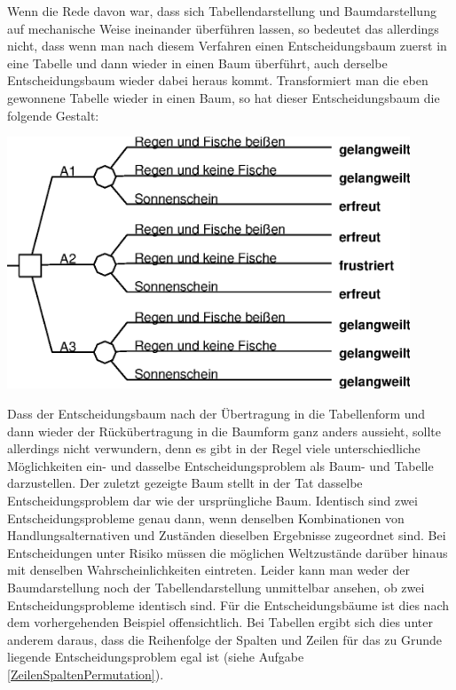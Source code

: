 Wenn die Rede davon war, dass sich Tabellendarstellung und
Baumdarstellung auf mechanische Weise ineinander überführen lassen, so
bedeutet das allerdings nicht, dass wenn man nach diesem Verfahren
einen Entscheidungsbaum zuerst in eine Tabelle und dann wieder in
einen Baum überführt, auch derselbe Entscheidungsbaum wieder dabei
heraus kommt. Transformiert man die eben gewonnene Tabelle wieder in
einen Baum, so hat dieser Entscheidungsbaum die folgende Gestalt:

\begin{center}
\includegraphics[width=12cm]{Grafiken/Beispiel1_4.eps}
\end{center}

Dass der Entscheidungsbaum nach der Übertragung in die Tabellenform und dann
wieder der Rückübertragung in die Baumform ganz anders aussieht, sollte
allerdings nicht verwundern, denn es gibt in der Regel viele unterschiedliche 
Möglichkeiten ein- und dasselbe Entscheidungsproblem als Baum- und Tabelle
darzustellen. Der zuletzt gezeigte Baum stellt in der Tat dasselbe
Entscheidungsproblem dar wie der ursprüngliche Baum. Identisch sind zwei
Entscheidungsprobleme genau dann, wenn denselben Kombinationen von
Handlungsalternativen und Zuständen dieselben Ergebnisse zugeordnet sind. Bei
Entscheidungen unter Risiko müssen die möglichen Weltzustände darüber hinaus
mit denselben Wahrscheinlichkeiten eintreten. Leider kann man weder der
Baumdarstellung noch der Tabellendarstellung unmittelbar ansehen, ob zwei
Entscheidungsprobleme identisch sind. Für die Entscheidungsbäume ist dies nach
dem vorhergehenden Beispiel offensichtlich. Bei Tabellen ergibt sich dies unter
anderem daraus, dass die Reihenfolge der Spalten und Zeilen für das zu Grunde
liegende Entscheidungsproblem egal ist (siehe Aufgabe
\ref{ZeilenSpaltenPermutation}).


